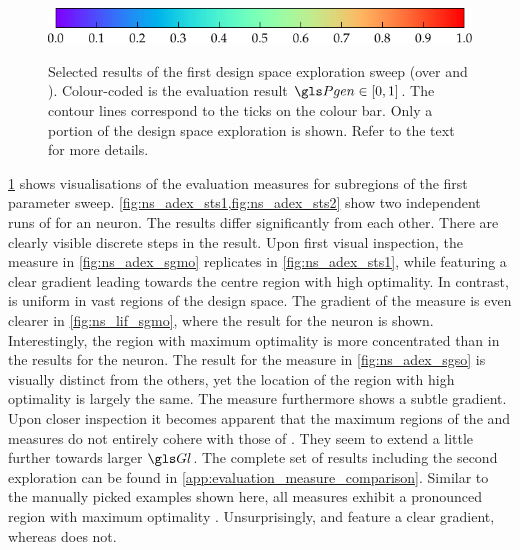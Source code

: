 \begin{figure}[p]
{		\label{fig:ns_adex_sgso}
	}
	\hspace*{7mm}\includegraphics{media/chp4/evaluation/colorbar.pdf}
	\caption[Design space exploration results]{Selected results of the first design space exploration sweep (over \Gl and \TauE). Colour-coded is the evaluation result $\Pgen \in [0, 1]$. The contour lines correspond to the ticks on the colour bar. Only a portion of the design space exploration is shown. Refer to the text for more details.}
	\label{fig:ns}
\end{figure}
\cref{fig:ns} shows visualisations of the evaluation measures for subregions of the first parameter sweep. \cref{fig:ns_adex_sts1,fig:ns_adex_sts2} show two independent runs of \STI for an \AdEx neuron. The results differ significantly from each other. There are clearly visible discrete steps in the result. Upon first visual inspection, the \SGMO measure in \cref{fig:ns_adex_sgmo} replicates \STII in \cref{fig:ns_adex_sts1}, while featuring a clear gradient leading towards the centre region with high optimality. In contrast, \STII is uniform in vast regions of the design space. The gradient of the \SGMO measure is even clearer in \cref{fig:ns_lif_sgmo}, where the result for the \LIF neuron is shown. Interestingly, the region with maximum optimality is more concentrated than in the results for the \AdEx neuron. The result for the \SGSO measure in \cref{fig:ns_adex_sgso} is visually distinct from the others, yet the location of the region with high optimality is largely the same. The \SGSO measure furthermore shows a subtle gradient. Upon closer inspection it becomes apparent that the maximum regions of the \SGMO and \SGSO measures do not entirely cohere with those of \STII. They seem to extend a little further towards larger $\Gl$. The complete set of results including the second exploration can be found in \cref{app:evaluation_measure_comparison}. Similar to the manually picked examples shown here, all measures exhibit a pronounced region with maximum optimality \Pgen. Unsurprisingly, \SGSO and \SGMO feature a clear gradient, whereas \STII does not.


